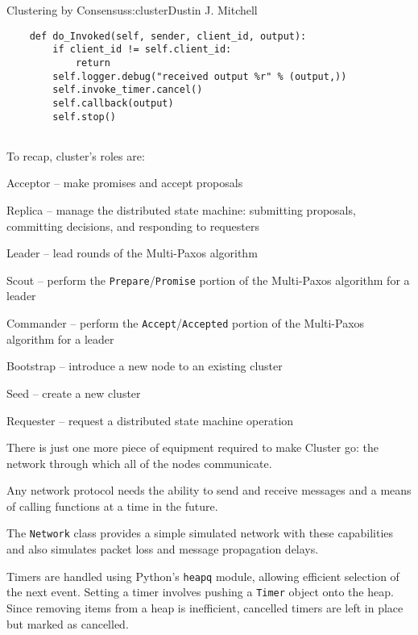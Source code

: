 \begin{aosachapter}{Clustering by Consensus}{s:cluster}{Dustin J. Mitchell}
\begin{verbatim}
    def do_Invoked(self, sender, client_id, output):
        if client_id != self.client_id:
            return
        self.logger.debug("received output %r" % (output,))
        self.invoke_timer.cancel()
        self.callback(output)
        self.stop()
    
\end{verbatim}

\label{summary}

To recap, cluster's roles are:

\begin{aosaitemize}

\item
  Acceptor -- make promises and accept proposals
\item
  Replica -- manage the distributed state machine: submitting proposals,
  committing decisions, and responding to requesters
\item
  Leader -- lead rounds of the Multi-Paxos algorithm
\item
  Scout -- perform the \texttt{Prepare}/\texttt{Promise} portion of the
  Multi-Paxos algorithm for a leader
\item
  Commander -- perform the \texttt{Accept}/\texttt{Accepted} portion of
  the Multi-Paxos algorithm for a leader
\item
  Bootstrap -- introduce a new node to an existing cluster
\item
  Seed -- create a new cluster
\item
  Requester -- request a distributed state machine operation
\end{aosaitemize}

There is just one more piece of equipment required to make Cluster go:
the network through which all of the nodes communicate.

\label{network}

Any network protocol needs the ability to send and receive messages and
a means of calling functions at a time in the future.

The \texttt{Network} class provides a simple simulated network with
these capabilities and also simulates packet loss and message
propagation delays.

Timers are handled using Python's \texttt{heapq} module, allowing
efficient selection of the next event. Setting a timer involves pushing
a \texttt{Timer} object onto the heap. Since removing items from a heap
is inefficient, cancelled timers are left in place but marked as
cancelled.


\end{aosachapter}
